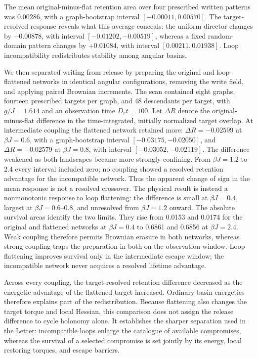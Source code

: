 \documentclass[aps,prl,onecolumn,superscriptaddress,nofootinbib]{revtex4-2}
\begin{document}
The mean original-minus-flat retention area over four prescribed written
patterns was \(0.00286\), with a graph-bootstrap interval
\([-0.00011,0.00570]\). The target-resolved response reveals what this average
conceals: the uniform director changes by \(-0.00878\), with interval
\([-0.01202,-0.00519]\), whereas a fixed random-domain pattern changes by
\(+0.01084\), with interval \([0.00211,0.01938]\). Loop incompatibility
redistributes stability among angular basins.

We then separated writing from release by preparing the original and
loop-flattened networks in identical angular configurations, removing the
write field, and applying paired Brownian increments.  The scan contained
eight graphs, fourteen prescribed targets per graph, and 48 descendants per
target, with \(g/J=1.614\) and an observation time \(D_rt=100\).  Let
\(\Delta R\) denote the original-minus-flat difference in the time-integrated,
initially normalized target overlap.  At intermediate coupling the flattened
network retained more: \(\Delta R=-0.02599\) at \(\beta J=0.6\), with a
graph-bootstrap interval \([-0.03175,-0.02050]\), and
\(\Delta R=-0.02579\) at \(\beta J=0.8\), with interval
\([-0.03052,-0.02119]\).  The difference weakened as both landscapes became
more strongly confining.  From \(\beta J=1.2\) to 2.4 every interval included
zero; no coupling showed a resolved retention advantage for the incompatible
network.  Thus the apparent change of sign in the mean response is not a
resolved crossover.  The physical result is instead a nonmonotonic response
to loop flattening: the difference is small at \(\beta J=0.4\), largest at
\(\beta J=0.6\)--0.8, and unresolved from \(\beta J=1.2\) onward.  The
absolute survival areas identify the two limits.  They rise from 0.0153 and
0.0174 for the original and flattened networks at \(\beta J=0.4\) to 0.6861
and 0.6856 at \(\beta J=2.4\).  Weak coupling therefore permits Brownian
erasure in both networks, whereas strong coupling traps the preparation in
both on the observation window.  Loop flattening improves survival only in
the intermediate escape window; the incompatible network never acquires a
resolved lifetime advantage.

Across every coupling, the target-resolved retention difference decreased as
the energetic advantage of the flattened target increased.  Ordinary basin
energetics therefore explains part of the redistribution.  Because flattening
also changes the target torque and local Hessian, this comparison does not
assign the release difference to cycle holonomy alone.  It establishes the
sharper separation used in the Letter: incompatible loops enlarge the
catalogue of available compromises, whereas the survival of a selected
compromise is set jointly by its energy, local restoring torques, and escape
barriers.
\end{document}
